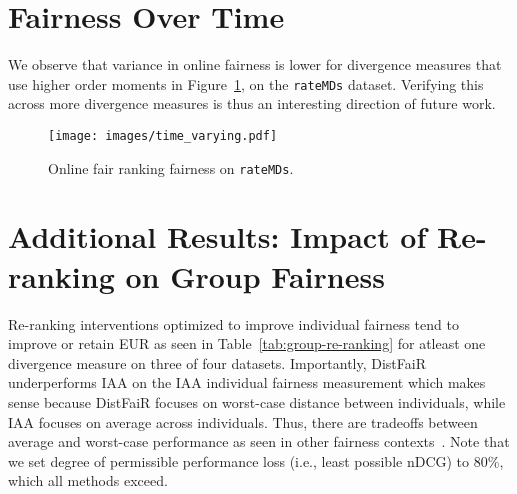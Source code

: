 \section{Fairness Over Time}
We observe that variance in online fairness is lower for divergence measures that use higher order moments in Figure~\ref{fig:online_fairness}, on the \texttt{rateMDs} dataset. Verifying this across more divergence measures is thus an interesting direction of future work.
\begin{figure}[htb!]
    \centering
    \texttt{[image: images/time\_varying.pdf]}
    \caption{Online fair ranking fairness on \texttt{rateMDs}.}
\label{fig:online_fairness}
\end{figure}

\section{Additional Results: Impact of Re-ranking on Group Fairness}


Re-ranking interventions optimized to improve individual fairness tend to improve or retain EUR as seen in Table~\ref{tab:group-re-ranking} for atleast one divergence measure on three of four datasets. Importantly, DistFaiR underperforms IAA on the IAA individual fairness measurement which makes sense because DistFaiR focuses on worst-case distance between individuals, while IAA focuses on average across individuals. Thus, there are tradeoffs between average and worst-case performance as seen in other fairness contexts~\cite{yang2023change}. Note that we set degree of permissible performance loss (i.e., least possible nDCG) to 80\%, which all methods exceed. 




